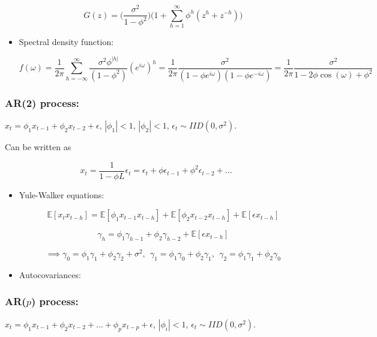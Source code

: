 \documentclass{article}
\newcommand{\E}{\mathbb{E}}
\begin{document}
\begin{itemize}
\[
G(z) = \bigg( \frac{\sigma^2}{1 - \phi ^2} \bigg) \bigg( 1 + \sum_{h=1}^\infty \phi^h(z^h + z^{-h}) \bigg)
\]


\item Spectral density function: 

\[
f(\omega) = \frac{1}{2\pi} \sum_{h=-\infty}^\infty \frac{\sigma^2 \phi^{|h|}}{(1 - \phi^2)} (e^{i \omega})^h = \frac{1}{2\pi} \frac{\sigma^2}{(1 - \phi e^{i \omega})(1 - \phi e^{- i \omega})} = \frac{1}{2 \pi} \frac{\sigma^2}{1 - 2 \phi \cos(\omega) + \phi^2}
\]


\end{itemize}


\subsubsection{AR(2) process:} \(x_t = \phi_1x_{t-1} + \phi_2x_{t-2} + \epsilon\), \(|\phi_1| < 1\), \(|\phi_2| < 1\), \(\epsilon_t \sim IID(0, \sigma^2)\). 

Can be written as 

\[
x_t = \frac{1}{1 - \phi L} \epsilon_t = \epsilon_t + \phi \epsilon_{t-1} + \phi^2 \epsilon_{t-2} + \ldots
\]

\begin{itemize}

\item Yule-Walker equations:

\[
\E[x_tx_{t-h} ]= \E[ \phi_1x_{t-1}x_{t-h}] +\E[ \phi_2x_{t-2}x_{t-h}] + \E[ \epsilon x_{t-h}]
\]

\[
\gamma_h = \phi_1 \gamma_{h-1} + \phi_2 \gamma_{h-2} + \E[ \epsilon x_{t-h}]
\]

\[
\implies \boxed{ \gamma_0 = \phi_1 \gamma_1 + \phi_2 \gamma_2 +\sigma^2,  \ \ \gamma_1 = \phi_1 \gamma_{0} + \phi_2 \gamma_{1}, \ \ \gamma_2 = \phi_1 \gamma_{1} + \phi_2 \gamma_{0}  }
\]

\item Autocovariances:

\end{itemize}


\subsubsection{AR(\(p\)) process:} \(x_t = \phi_1x_{t-1} + \phi_2x_{t-2} + \ldots + \phi_p x_{t-p} + \epsilon\), \(|\phi_i| < 1\), \(\epsilon_t \sim IID(0, \sigma^2)\). 
\end{document}
